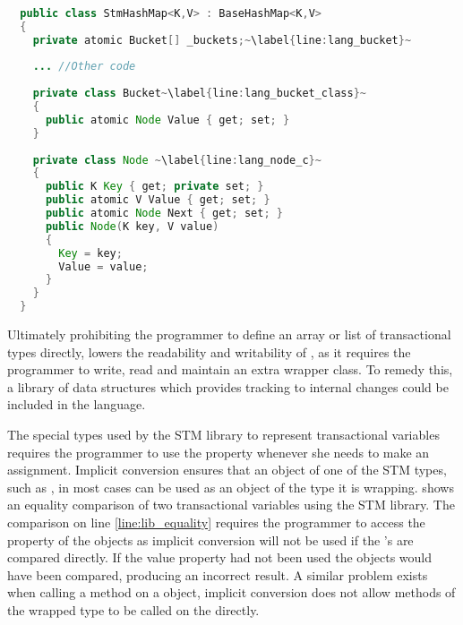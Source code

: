 \begin{lstlisting}[float,label=lst:lang_Buckets,
  caption={HashMap Buckets Array - \stmname},
  language=Java,  
  showspaces=false,
  showtabs=false,
  breaklines=true,
  showstringspaces=false,
  breakatwhitespace=true,
  escapechar=~,
  commentstyle=\color{greencomments},
  keywordstyle=\color{bluekeywords},
  stringstyle=\color{redstrings},
  morekeywords={atomic, retry, orelse, var, get, set, ref, out}]  % Start your code-block
  
  public class StmHashMap<K,V> : BaseHashMap<K,V>
  {
    private atomic Bucket[] _buckets;~\label{line:lang_bucket}~
  
    ... //Other code
    
    private class Bucket~\label{line:lang_bucket_class}~
    {
      public atomic Node Value { get; set; }
    }
  
    private class Node ~\label{line:lang_node_c}~
    {
      public K Key { get; private set; }
      public atomic V Value { get; set; }
      public atomic Node Next { get; set; }
      public Node(K key, V value)
      {
        Key = key;
        Value = value;
      }
    }
  }
\end{lstlisting}

Ultimately prohibiting the programmer to define an array or list of transactional types directly, lowers the readability and writability of \stmname, as it requires the programmer to write, read and maintain an extra wrapper class. To remedy this, a library of data structures which provides tracking to internal changes could be included in the language.

The special types used by the \ac{STM} library to represent transactional variables requires the programmer to use the  property whenever she needs to make an assignment. Implicit conversion ensures that an object of one of the \ac{STM} types, such as , in most cases can be used as an object of the type it is wrapping.  shows an equality comparison of two transactional variables using the \ac{STM} library. The comparison on line \ref{line:lib_equality} requires the programmer to access the  property of the  objects as implicit conversion will not be used if the 's are compared directly. If the value property had not been used the  objects would have been compared, producing an incorrect result. A similar problem exists when calling a method on a  object, implicit conversion does not allow methods of the wrapped type to be called on the  directly.

